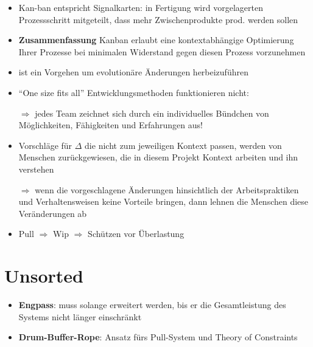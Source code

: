 \begin{itemize}
  \item Kan-ban entspricht Signalkarten: in Fertigung wird vorgelagerten Prozessschritt mitgeteilt,
    dass mehr Zwischenprodukte prod. werden sollen
  \item \textbf{Zusammenfassung} Kanban erlaubt eine kontextabhängige Optimierung Ihrer Prozesse bei
    minimalen Widerstand gegen diesen Prozess vorzunehmen
  \item ist ein Vorgehen um evolutionäre Änderungen herbeizuführen
  \item \enquote{One size fits all} Entwicklungsmethoden funktionieren nicht:
    $\Rightarrow$ jedes Team zeichnet sich durch ein individuelles Bündchen von Möglichkeiten, Fähigkeiten und
    Erfahrungen aus!
  \item Vorschläge für $\Delta$ die nicht zum jeweiligen Kontext passen, werden von Menschen
    zurückgewiesen, die in diesem Projekt Kontext arbeiten und ihn verstehen

    $\Rightarrow$  wenn die vorgeschlagene Änderungen hinsichtlich der Arbeitspraktiken und
    Verhaltensweisen keine Vorteile bringen, dann lehnen die Menschen diese Veränderungen ab
  \item Pull $\Rightarrow$ Wip $\Rightarrow$ Schützen vor Überlastung
\end{itemize}


\section{Unsorted}
\begin{itemize}
  \item \textbf{Engpass}: muss solange erweitert werden, bis er die Gesamtleistung des Systems nicht
    länger einschränkt
  \item \textbf{Drum-Buffer-Rope}: Ansatz fürs Pull-System und Theory of Constraints
\end{itemize}



